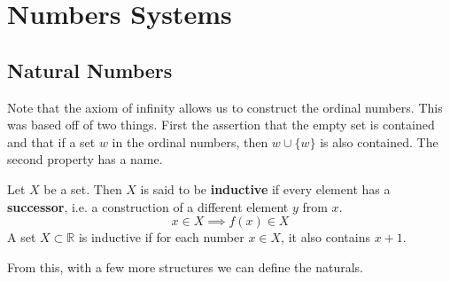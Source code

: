 \documentclass{article}
\begin{document}
\section{Numbers Systems} 

  \subsection{Natural Numbers}

    Note that the axiom of infinity allows us to construct the ordinal numbers. This was based off of two things. First the assertion that the empty set is contained and that if a set $w$ in the ordinal numbers, then $w \cup \{w\}$ is also contained. The second property has a name. 

    \begin{definition} 
      Let $X$ be a set. Then $X$ is said to be \textbf{inductive} if every element has a \textbf{successor}, i.e. a construction of a different element $y$ from $x$.  
      \begin{equation}
        x \in X \implies f(x) \in X
      \end{equation}
      A set 
      $X \subset \mathbb{R}$ is inductive if for each number $x \in X$, it also contains $x + 1$. 
    \end{definition} 

    From this, with a few more structures we can define the naturals. 
\end{document}
